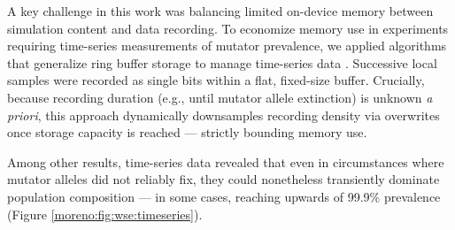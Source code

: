 A key challenge in this work was balancing limited on-device memory between simulation content and data recording.
To economize memory use in experiments requiring time-series measurements of mutator prevalence, we applied algorithms that generalize ring buffer storage to manage time-series data \cite{moreno2024algorithms,gunther2014algorithm}.
Successive local samples were recorded as single bits within a flat, fixed-size buffer.
Crucially, because recording duration (e.g., until mutator allele extinction) is unknown \textit{a priori}, this approach dynamically downsamples recording density via overwrites once storage capacity is reached --- strictly bounding memory use.

Among other results, time-series data revealed that even in circumstances where mutator alleles did not reliably fix, they could nonetheless transiently dominate population composition --- in some cases, reaching upwards of 99.9\% prevalence (Figure \ref{moreno:fig:wse:timeseries}).



